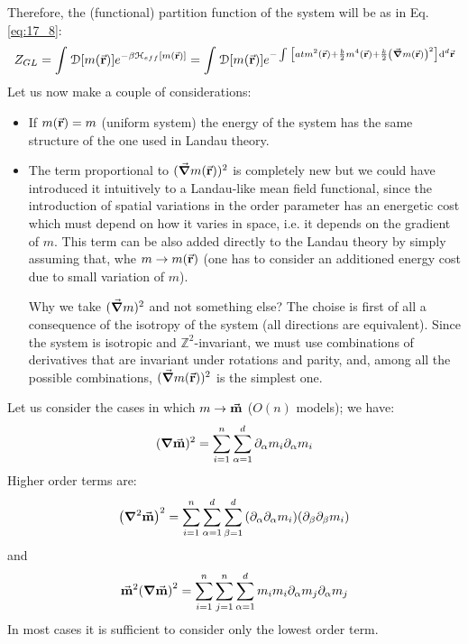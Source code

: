 \documentclass[../main/main.tex]{subfiles}
\begin{document}
Therefore, the (functional) partition function of the system will be as in Eq.\eqref{eq:17_8}:
\begin{equation}
  Z_{GL} = \int_{}^{} \mathcal{D} \qty[m(\va{r})]   e^{ -\beta \mathcal{H}_{eff} [m(\va{r})]}
   = \int_{}^{} \mathcal{D} \qty[m(\va{r})]  e^{-   \int_{}^{}  \qty[a t m^2 (\va{r}) + \frac{b}{2} m^4 (\va{r}) + \frac{k}{2} \qty(\va{\grad } m (\va{r}))^2] \dd[d]{\va{r}}   }
\end{equation}
Let us now make a couple of considerations:
\begin{itemize}
\item If \( m(\va{r}) = m \) (uniform system) the energy of the system has the same structure of the one used in Landau theory.
\item The term proportional to \(   (\va{\grad } m (\va{r}))^2 \) is completely new but we could have introduced it intuitively to a Landau-like mean field functional, since the introduction of spatial variations in the order parameter has an energetic cost which must depend on how it varies in space, i.e. it depends on the gradient of \( m \). This term can be also added directly to the Landau theory by simply assuming that, whe \( m \rightarrow m(\va{r}) \) (one has to consider an additioned energy cost due to small variation of \( m \)).

Why we take \( (\va{\grad }m)^2  \) and not something else?
The choise is first of all a consequence of the isotropy of the system (all directions are equivalent). Since the system is isotropic and \( \mathbb{Z}^2 \)-invariant, we must use combinations of derivatives that are invariant under rotations and parity, and, among all the possible combinations, \(   (\va{\grad } m (\va{r}))^2 \) is the simplest one.

\end{itemize}

\begin{remark}
Let us consider the cases in which  \( m \rightarrow \va{m} \) (\( O(n) \) models); we have:
\begin{equation*}
  (\grad \va{m})^2 = \sum_{i=1}^{n} \sum_{\alpha =1}^{d}  \partial_ \alpha {m_i} \partial_ \alpha   {m_i}
\end{equation*}
Higher order terms are:
\begin{equation*}
  \qty(\grad ^2 \va{m})^2 =  \sum_{i=1}^{n} \sum_{\alpha =1}^{d} \sum_{\beta =1}^{d}
  \qty(\partial_ \alpha \partial_ \alpha {m_i}) \qty( \partial_ \beta \partial_ \beta {m_i})
\end{equation*}
and
\begin{equation*}
  \va{m}^2 \qty(\grad  \va{m})^2 =  \sum_{i=1}^{n} \sum_{j=1}^{n} \sum_{\alpha  =1}^{d} m_i m_i \partial_ \alpha {m_j} \partial_ \alpha {m_j}
\end{equation*}
In most cases it is sufficient to consider only the lowest order term.
\end{remark}
\end{document}
